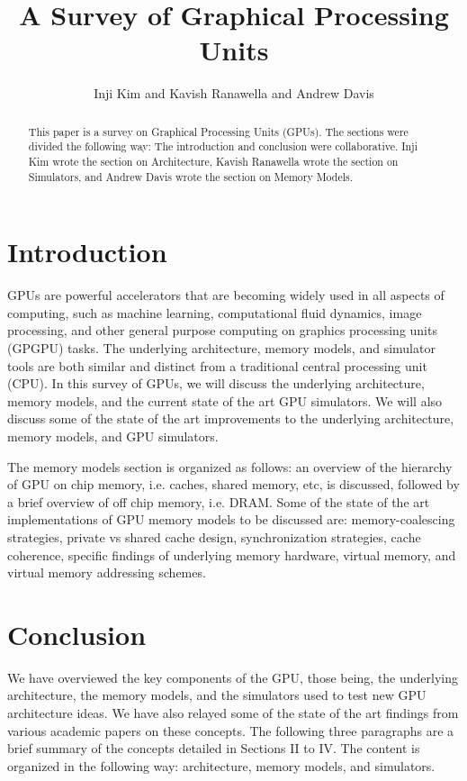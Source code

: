 \documentclass[conference]{IEEEtran}
\title{A Survey of Graphical Processing Units}
\author{\normalsize{Inji Kim and Kavish Ranawella and Andrew Davis}}
\begin{document}
\maketitle
\thispagestyle{plain}
\pagestyle{plain}




\begin{abstract}
  This paper is a survey on Graphical Processing Units (GPUs).
  The sections were divided the following way: The introduction and conclusion were collaborative.
  Inji Kim wrote the section on Architecture, Kavish Ranawella wrote the section on Simulators, and Andrew Davis wrote the section on Memory Models.
\end{abstract}

\section{Introduction}
GPUs are powerful accelerators that are becoming widely used in all aspects of computing, such as machine learning, computational fluid dynamics, image processing, and other general purpose computing on graphics processing units (GPGPU) tasks.
The underlying architecture, memory models, and simulator tools are both similar and distinct from a traditional central processing unit (CPU).
In this survey of GPUs, we will discuss the underlying architecture, memory models, and the current state of the art GPU simulators.
We will also discuss some of the state of the art improvements to the underlying architecture, memory models, and GPU simulators.

The memory models section is organized as follows: an overview of the hierarchy of GPU on chip memory, i.e. caches, shared memory, etc, is discussed, followed by a brief overview of off chip memory, i.e. DRAM.
Some of the state of the art implementations of GPU memory models to be discussed are: memory-coalescing strategies, private vs shared cache design, synchronization strategies, cache coherence, specific findings of underlying memory hardware, virtual memory, and virtual memory addressing schemes.




\section{Conclusion}
We have overviewed the key components of the GPU, those being, the underlying architecture, the memory models, and the simulators used to test new GPU architecture ideas.
We have also relayed some of the state of the art findings from various academic papers on these concepts.
The following three paragraphs are a brief summary of the concepts detailed in Sections II to IV. The content is organized in the following way: architecture, memory models, and simulators.
\end{document}
